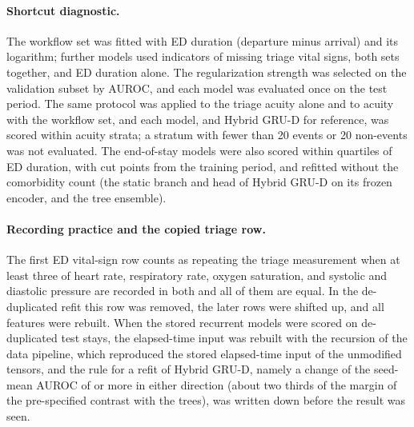 \paragraph{Shortcut diagnostic.} The workflow set was fitted with ED duration (departure minus arrival) and its logarithm; further models used indicators of missing triage vital signs, both sets together, and ED duration alone. The regularization strength was selected on the validation subset by AUROC, and each model was evaluated once on the test period. The same protocol was applied to the triage acuity alone and to acuity with the workflow set, and each model, and Hybrid GRU-D for reference, was scored within acuity strata; a stratum with fewer than 20 events or 20 non-events was not evaluated. The end-of-stay models were also scored within quartiles of ED duration, with cut points from the training period, and refitted without the comorbidity count (the static branch and head of Hybrid GRU-D on its frozen encoder, and the tree ensemble).

\paragraph{Recording practice and the copied triage row.} The first ED vital-sign row counts as repeating the triage measurement when at least three of heart rate, respiratory rate, oxygen saturation, and systolic and diastolic pressure are recorded in both and all of them are equal. In the de-duplicated refit this row was removed, the later rows were shifted up, and all features were rebuilt. When the stored recurrent models were scored on de-duplicated test stays, the elapsed-time input was rebuilt with the recursion of the data pipeline, which reproduced the stored elapsed-time input of the unmodified tensors, and the rule for a refit of Hybrid GRU-D, namely a change of the seed-mean AUROC of \RVGrudRule{} or more in either direction (about two thirds of the margin of the pre-specified contrast with the trees), was written down before the result was seen.

